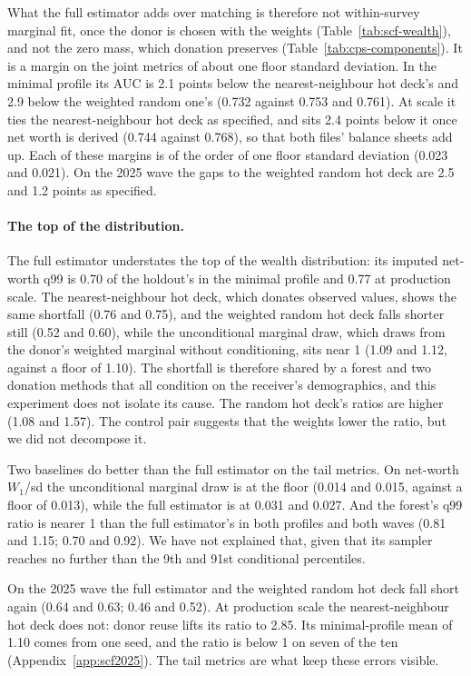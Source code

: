 What the full estimator adds over matching is
therefore not within-survey marginal fit, once the donor is chosen with the
weights (Table~\ref{tab:scf-wealth}), and not the zero mass, which donation
preserves (Table~\ref{tab:cps-components}). It is a margin on the joint
metrics of about one floor standard deviation. In the minimal profile its
AUC is 2.1 points below the
nearest-neighbour hot deck's and 2.9 below the weighted random one's (0.732
against 0.753 and 0.761). At scale it ties the
nearest-neighbour hot deck as specified, and sits 2.4 points below it once
net worth is derived (0.744 against 0.768), so that both files' balance
sheets add up. Each of these margins is of the order of one floor standard
deviation (0.023 and 0.021). On the 2025 wave the gaps to the weighted
random hot deck are 2.5 and 1.2 points as specified.

\paragraph{The top of the distribution.} The full estimator understates the
top of the wealth distribution: its imputed net-worth q99 is 0.70 of the
holdout's in the minimal profile and 0.77 at production scale. The
nearest-neighbour hot deck, which donates observed values, shows the same
shortfall (0.76 and 0.75), and the weighted random hot deck falls shorter
still (0.52 and 0.60), while the unconditional marginal draw, which draws
from the donor's weighted marginal without conditioning, sits near 1 (1.09
and 1.12, against a floor of 1.10). The shortfall is therefore shared by a
forest and two donation methods that all condition on the receiver's
demographics, and this experiment does not isolate its cause. The random
hot deck's ratios are higher (1.08 and 1.57). The control pair suggests
that the weights lower the ratio, but we did not decompose it.

Two baselines do better than the full estimator on the tail metrics. On
net-worth $W_1$/sd the unconditional marginal draw is at the floor (0.014
and 0.015, against a floor of 0.013), while the full estimator is at 0.031
and 0.027. And the \microimpute{} forest's q99 ratio is nearer 1 than the
full estimator's in both profiles and both waves (0.81 and 1.15; 0.70 and
0.92). We have not explained that, given that its sampler reaches no
further than the 9th and 91st conditional percentiles.

On the 2025 wave the full estimator and the weighted random hot deck fall
short again (0.64 and 0.63; 0.46 and 0.52). At production scale the
nearest-neighbour hot deck does not: donor reuse lifts its ratio to 2.85.
Its minimal-profile mean of 1.10 comes from one seed, and the ratio is below
1 on seven of the ten (Appendix~\ref{app:scf2025}). The tail metrics are
what keep these errors visible.

